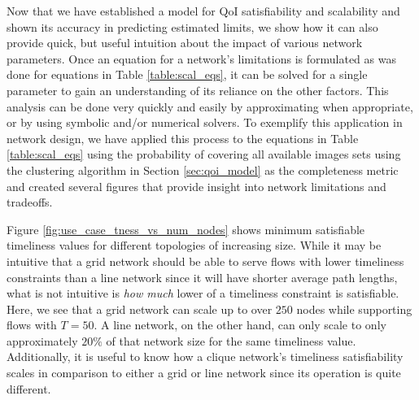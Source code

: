  
Now that we have established a model for QoI satisfiability and scalability and shown its accuracy in predicting estimated limits, we show how it can also provide quick, but useful intuition about the impact of various network parameters.  Once an equation for a network's limitations is formulated as was done for equations in Table \ref{table:scal_eqs}, it can be solved for a single parameter to gain an understanding of its reliance on the other factors.  This analysis can be done very quickly and easily by approximating when appropriate, or by using symbolic and/or numerical solvers.  To exemplify this application in network design, we have applied this process to the equations in Table \ref{table:scal_eqs} using the probability of covering all available images sets using the clustering algorithm in Section \ref{sec:qoi_model} as the completeness metric and created several figures that provide insight into network limitations and tradeoffs. 

Figure \ref{fig:use_case_tness_vs_num_nodes} shows minimum satisfiable timeliness values for different topologies of increasing size.  While it may be intuitive that a grid network should be able to serve flows with lower timeliness constraints than a line network since it will have shorter average path lengths, what is not intuitive is \emph{how much} lower of a timeliness constraint is satisfiable.  Here, we see that a grid network can scale up to over $250$ nodes while supporting flows with $T = 50$.  A line network, on the other hand, can only scale to only approximately $20\%$ of that network size for the same timeliness value.  Additionally, it is useful to know how a clique network's timeliness satisfiability scales in comparison to either a grid or line network since its operation is quite different.

